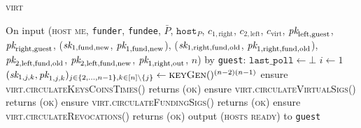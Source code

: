 \begin{center}
\begin{processbox}{\textsc{virt}}
\begin{algorithmic}[1]
      \State On input (\textsc{host me}, \texttt{funder}, \texttt{fundee},
      $\bar{P}$, $\texttt{host}_P$, $c_{1, \mathrm{right}}$, $c_{2,
      \mathrm{left}}$, $c_{\mathrm{virt}}$, $\textit{pk}_{\mathrm{left},
      \mathrm{guest}}$, $\textit{pk}_{\mathrm{right}, \mathrm{guest}}$, ($\textit{sk}_{1,
      \mathrm{fund}, \mathrm{new}}$, $\textit{pk}_{1, \mathrm{fund}, \mathrm{new}}$),
      ($\textit{sk}_{1, \mathrm{right}, \mathrm{fund}, \mathrm{old}}$, $\textit{pk}_{1,
      \mathrm{right}, \mathrm{fund}, \mathrm{old}}$), $\textit{pk}_{2, \mathrm{left},
      \mathrm{fund}, \mathrm{old}}$, $\textit{pk}_{2, \mathrm{left}, \mathrm{fund},
      \mathrm{new}}$, $\textit{pk}_{1, \mathrm{right}, \mathrm{out}}$, $n$) by
      \texttt{guest}:
      \Indent
        \State $\texttt{last\_poll} \gets \bot$
        \State $i \gets 1$
        \State $(\textit{sk}_{1, j, k}, \textit{pk}_{1, j, k})_{j \in \{2, \dots, n-1\}, k \in [n]
        \setminus \{j\}} \gets \textsc{keyGen}()^{(n-2)(n-1)}$
        \State ensure \textsc{virt.circulateKeysCoinsTimes}() returns
        (\textsc{ok})
        \State ensure \textsc{virt.circulateVirtualSigs}() returns (\textsc{ok})
        \State ensure \textsc{virt.circulateFundingSigs}() returns (\textsc{ok})
        \State ensure \textsc{virt.circulateRevocations}() returns (\textsc{ok})
        \State output (\textsc{hosts ready}) to \texttt{guest}
      \EndIndent
    \end{algorithmic}
  \end{processbox}
  \label{code:virtual-layer:keys}
\end{center}

